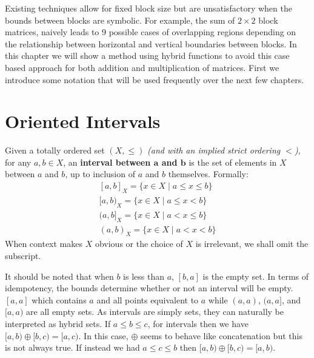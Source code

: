 Existing techniques allow for fixed block size but are unsatisfactory when the bounds between blocks are symbolic.
For example, the sum of $2 \times 2$ block matrices, naively leads to 9 possible cases of overlapping regions depending on
the relationship between horizontal and vertical boundaries between blocks.
In this chapter we will show a method using hybrid functions to avoid this case based approach for both addition
and multiplication of matrices.
First we introduce some notation that will be used frequently over the next few chapters.

%
%

\section{Oriented Intervals}
\label{sec:OrientedIntervals}

\begin{definition}
	Given a totally ordered set $(X, \leq)$ \emph{(and with an implied strict ordering $<$)}, 
	for any $a,b \in X$, an \textbf{interval between $\boldsymbol{a}$ and $\boldsymbol{b}$} 
	is the set of elements in $X$ between $a$ and $b$, up to inclusion of $a$ and $b$ themselves. 
	Formally:
	\begin{equation} 
	\begin{array}{cc}
		{[a,b]}_X =  \{ x \in X \;|\; a \leq x \leq b \} \\
		{[a,b)}_X =  \{ x \in X \;|\; a \leq x < b \} \\
		{(a,b]}_X =  \{ x \in X \;|\; a < x \leq b \} \\
		{(a,b)}_X =  \{ x \in X \;|\; a < x < b \}
	\end{array} 
	\end{equation}
	When context makes $X$ obvious or the choice of $X$ is irrelevant, we shall omit the subscript.
\end{definition}

It should be noted that when $b$ is less than $a$, $[b,a]$ is the empty set. 
In terms of idempotency, the bounds determine whether or not an interval will be empty.
$[a,a]$ which contains $a$ and all points equivalent to $a$ while $(a,a)$, $(a,a]$, and $[a,a)$ are all empty sets.
As intervals are simply sets, they can naturally be interpreted as hybrid sets.
If $a \leq b \leq c$, for intervals then we have $[a,b) \oplus [b,c) = [a,c)$.
In this case, $\oplus$ seems to behave like concatenation but this is not always true.
If instead we had $a \leq c \leq b$ then $[a,b) \oplus [b,c) = [a,b)$.

